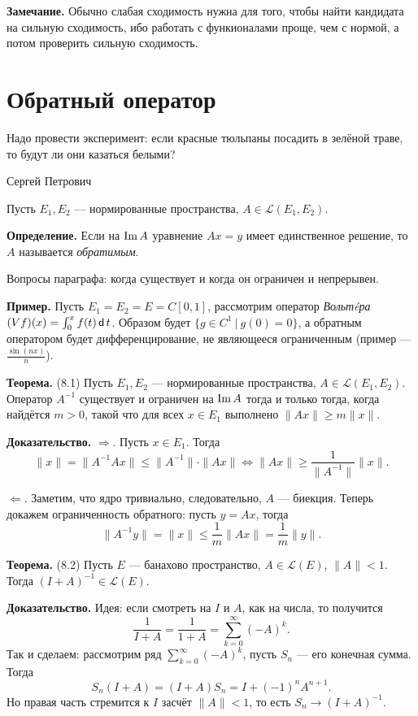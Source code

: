\textbf{Замечание.} Обычно слабая сходимость нужна для того, чтобы найти кандидата на сильную сходимость, ибо работать с функионалами проще, чем с нормой, а потом проверить сильную сходимость.

\section{Обратный оператор}
\epigraph{Надо провести эксперимент: если красные тюльпаны посадить в зелёной траве, то будут ли они казаться белыми?}{Сергей Петрович}
Пусть $E_1, E_2$ --- нормированные пространства, $A \in \mathcal L(E_1, E_2)$.

\textbf{Определение.} Если на $\operatorname{Im} A$ уравнение $Ax = y$ имеет единственное решение, то $A$ называется \textit{обратимым}.

Вопросы параграфа: когда существует и когда он ограничен и непрерывен.

\textbf{Пример.} Пусть $E_1 = E_2 = E = C[0, 1]$, рассмотрим оператор \textit{Вольтéра} $(Vf)(x) = \int_0^x f(t) \operatorname{\mathsf d} t$.
Образом будет $\{g \in C^1~|~g(0) = 0\}$, а обратным оператором будет дифференцирование, не являющееся ограниченным (пример --- $\frac{\sin(nx)}{n}$).

\label{th:8-1} \textbf{Теорема.} (8.1) Пусть $E_1, E_2$ --- нормированные пространства, $A \in \mathcal L(E_1, E_2)$.
Оператор $A^{-1}$ существует и ограничен на $\operatorname{Im} A$ тогда и только тогда, когда найдётся $m > 0$, такой что для всех $x \in E_1$ выполнено $\|Ax\| \ge m\|x\|$.

\textbf{Доказательство.} $\Rightarrow$. Пусть $x \in E_1$.
Тогда
\[
    \|x\| = \|A^{-1} A x\| \le \|A^{-1}\| \cdot \|Ax\| \iff \|Ax\| \ge \frac{1}{\|A^{-1}\|}\|x\|.
\]

$\Leftarrow$. Заметим, что ядро тривиально, следовательно, $A$ --- биекция.
Теперь докажем ограниченность обратного: пусть $y = Ax$, тогда
\[
    \|A^{-1} y\| = \|x\| \le \frac{1}{m} \|Ax\| = \frac{1}{m} \|y\|.
\]

\QED

\label{th:8-2} \textbf{Теорема.} (8.2) Пусть $E$ --- банахово пространство, $A \in \mathcal L(E)$, $\|A\| < 1$.
Тогда $(I + A)^{-1} \in \mathcal L(E)$.

\textbf{Доказательство.} Идея: если смотреть на $I$ и $A$, как на числа, то получится
\[
    \frac{1}{I + A} = \frac{1}{1 + A} = \sum_{k=0}^{\infty} (-A)^k.
\]
Так и сделаем: рассмотрим ряд $\sum_{k=0}^{\infty} (-A)^k$, пусть $S_n$ --- его конечная сумма.
Тогда 
\[
    S_n(I + A) = (I + A) S_n = I + (-1)^n A^{n+1}.
\]
Но правая часть стремится к $I$ засчёт $\|A\| < 1$, то есть $S_n \to (I + A)^{-1}$.

